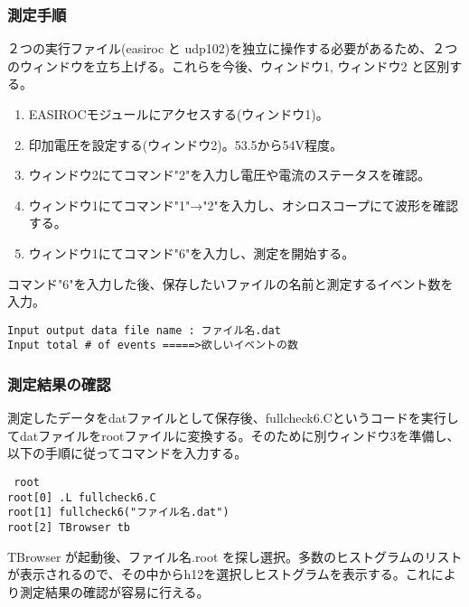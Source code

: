 \documentclass[10pt,a4j]{jarticle}
\begin{document}
\subsubsection{測定手順}
２つの実行ファイル(easiroc と udp102)を独立に操作する必要があるため、２つのウィンドウを立ち上げる。これらを今後、ウィンドウ1, ウィンドウ2 と区別する。
\begin{enumerate}
\item EASIROCモジュールにアクセスする(ウィンドウ1)。
\item 印加電圧を設定する(ウィンドウ2)。53.5から54V程度。
\item ウィンドウ2にてコマンド"2"を入力し電圧や電流のステータスを確認。
\item ウィンドウ1にてコマンド"1"→"2"を入力し、オシロスコープにて波形を確認する。
\item ウィンドウ1にてコマンド"6"を入力し、測定を開始する。
\end{enumerate}
コマンド"6"を入力した後、保存したいファイルの名前と測定するイベント数を入力。
\begin{lstlisting}
Input output data file name : ファイル名.dat  　
Input total # of events =====>欲しいイベントの数                         
\end{lstlisting}

\subsubsection{測定結果の確認}
測定したデータをdatファイルとして保存後、fullcheck6.Cというコードを実行してdatファイルをrootファイルに変換する。そのために別ウィンドウ3を準備し、以下の手順に従ってコマンドを入力する。
\begin{lstlisting}
 root
root[0] .L fullcheck6.C
root[1] fullcheck6("ファイル名.dat")　　
root[2] TBrowser tb　　　　　　　　      
\end{lstlisting}
TBrowser が起動後、ファイル名.root を探し選択。多数のヒストグラムのリストが表示されるので、その中からh12を選択しヒストグラムを表示する。これにより測定結果の確認が容易に行える。
\end{document}
